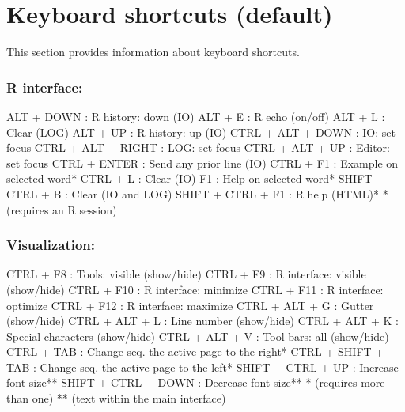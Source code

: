 
\hypertarget{basic_card}{}
\section{Keyboard shortcuts (default)}

This section provides information about keyboard shortcuts.

\hypertarget{basic_card_mostused}{}
\subsubsection{R interface:}

\vspace{-0.5cm}
\begin{Rtables}[caption={[R interface keyboard shortcuts]
    R interface keyboard shortcuts},
  label=hotkey:rinterface]
  ALT  + DOWN            : R history: down (IO)
  ALT  + E               : R echo (on/off)
  ALT  + L               : Clear (LOG)
  ALT  + UP              : R history: up (IO)
  CTRL + ALT + DOWN      : IO: set focus
  CTRL + ALT + RIGHT     : LOG: set focus
  CTRL + ALT + UP        : Editor: set focus
  CTRL + ENTER           : Send any prior line (IO)
  CTRL + F1              : Example on selected word*
  CTRL + L               : Clear (IO)
  F1                     : Help on selected word*
  SHIFT + CTRL + B       : Clear (IO and LOG)
  SHIFT + CTRL + F1      : R help (HTML)*
  * (requires an R session)
\end{Rtables}


\subsubsection{Visualization:}

\vspace{-0.5cm}
\begin{Rtables}[caption={[Visualization keyboard shortcuts]
    Visualization keyboard shortcuts},
  label=hotkey:visualization]
  CTRL  + F8              : Tools: visible (show/hide)
  CTRL  + F9              : R interface: visible (show/hide)
  CTRL  + F10             : R interface: minimize
  CTRL  + F11             : R interface: optimize
  CTRL  + F12             : R interface: maximize
  CTRL  + ALT  + G        : Gutter (show/hide)
  CTRL  + ALT  + L        : Line number (show/hide)
  CTRL  + ALT  + K        : Special characters (show/hide)
  CTRL  + ALT  + V        : Tool bars: all (show/hide)
  CTRL  + TAB             : Change seq. the active page to the right*
  CTRL  + SHIFT + TAB     : Change seq. the active page to the left*
  SHIFT + CTRL + UP       : Increase font size**
  SHIFT + CTRL + DOWN     : Decrease font size**
  *  (requires more than one)
  ** (text within the main interface)
\end{Rtables}



